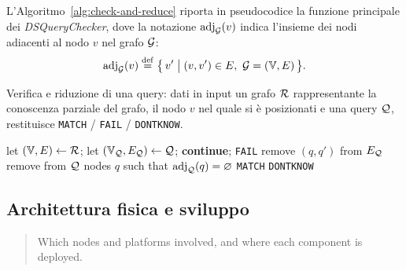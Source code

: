 L'Algoritmo~\ref{alg:check-and-reduce} riporta in pseudocodice
la funzione principale dei \emph{DSQueryChecker}, dove la
notazione $\mathrm{adj}_{\mathcal{G}}(v)$ indica l'insieme dei nodi
adiacenti al nodo $v$ nel grafo $\mathcal{G}$:
\[
\adj{v}{\cG} \defeq \bigl\{\, v' \bigm| (v, v') \in E,
\ \cG = (\Vset, E) \,\bigr\}.
\]

\begin{algorithm}
  \caption{Verifica e riduzione di una query: dati in input
    un grafo $\mathcal{R}$ rappresentante la conoscenza parziale del grafo,
    il nodo $v$ nel quale si è posizionati e
    una query $\mathcal{Q}$, restituisce \texttt{MATCH} / \texttt{FAIL}
    / \texttt{DONTKNOW}.
  }
\label{alg:check-and-reduce}
\begin{algorithmic}[2]
  \State let $(\mathbb{V}, E) \gets \mathcal{R}$;
  \State let $(\mathbb{V}_{\mathcal{Q}}, E_{\mathcal{Q}}) \gets \mathcal{Q}$;
  \State {}
     \textbf{continue}; \EndIf
       \State \Return \texttt{FAIL}
    \EndIf
      \State remove $(q, q')$ from $E_{\mathcal{Q}}$
      \EndIf
    \EndFor
  \EndFor
  \State remove from $\mathcal{Q}$ nodes $q$ such that
  $\mathrm{adj}_{\mathcal{Q}}(q) = \varnothing$
  \If {$\Vset_\cQ = \varnothing$}
    \State \Return \texttt{MATCH}
  \Else
    \State \Return \texttt{DONTKNOW}
  \EndIf
\EndFunction
\end{algorithmic}
\end{algorithm}

\subsection{Architettura fisica e sviluppo}
\label{sec:deploy}
\begin{quote}
Which nodes and platforms involved, and where each
component is deployed.
\end{quote}


